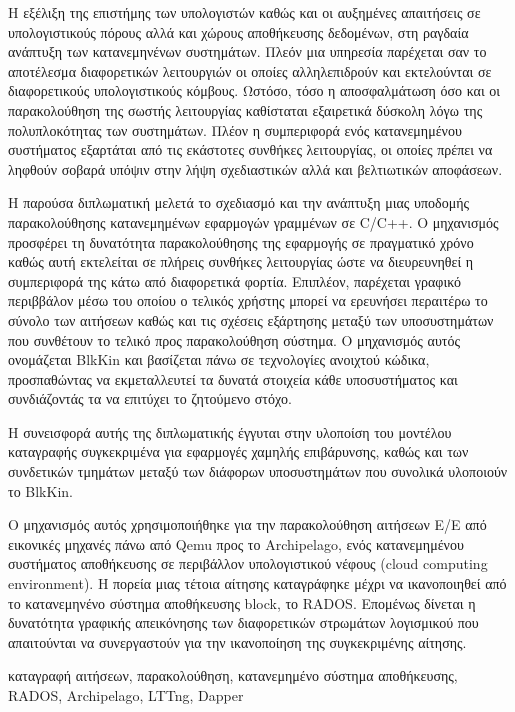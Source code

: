 \begin{abstractgr}
Η εξέλιξη της επιστήμης των υπολογιστών καθώς και οι αυξημένες απαιτήσεις σε
υπολογιστικούς πόρους αλλά και χώρους αποθήκευσης δεδομένων, στη ραγδαία
ανάπτυξη των κατανεμηνένων συστημάτων. Πλεόν μια υπηρεσία παρέχεται σαν το
αποτέλεσμα διαφορετικών λειτουργιών οι οποίες αλληλεπιδρούν και εκτελούνται σε
διαφορετικούς υπολογιστικούς κόμβους. Ωστόσο, τόσο η αποσφαλμάτωση όσο και οι
παρακολούθηση της σωστής λειτουργίας καθίσταται εξαιρετικά δύσκολη λόγω της
πολυπλοκότητας των συστημάτων. Πλέον η συμπεριφορά ενός κατανεμημένου συστήματος
εξαρτάται από τις εκάστοτες συνθήκες λειτουργίας, οι οποίες πρέπει να ληφθούν
σοβαρά υπόψιν στην λήψη σχεδιαστικών αλλά και βελτιωτικών αποφάσεων.

Η παρούσα διπλωματική μελετά το σχεδιασμό και την ανάπτυξη μιας υποδομής
παρακολούθησης κατανεμημένων εφαρμογών γραμμένων σε C/C++. Ο μηχανισμός
προσφέρει τη δυνατότητα παρακολούθησης της εφαρμογής σε πραγματικό χρόνο καθώς
αυτή εκτελείται σε πλήρεις συνθήκες λειτουργίας ώστε να διευρευνηθεί η
συμπεριφορά της κάτω από διαφορετικά φορτία. Επιπλέον, παρέχεται γραφικό
περιββάλον μέσω του οποίου ο τελικός χρήστης μπορεί να ερευνήσει περαιτέρω το
σύνολο των αιτήσεων καθώς και τις σχέσεις εξάρτησης μεταξύ των υποσυστημάτων που
συνθέτουν το τελικό προς παρακολούθηση σύστημα. Ο μηχανισμός αυτός ονομάζεται
BlkKin και βασίζεται πάνω σε τεχνολογίες ανοιχτού κώδικα, προσπαθώντας να
εκμεταλλευτεί τα δυνατά στοιχεία κάθε υποσυστήματος και συνδιάζοντάς τα να
επιτύχει το ζητούμενο στόχο.

Η συνεισφορά αυτής της διπλωματικής έγγυται στην υλοποίση του μοντέλου
καταγραφής συγκεκριμένα για εφαρμογές χαμηλής επιβάρυνσης, καθώς και των
συνδετικών τμημάτων μεταξύ των διάφορων υποσυστημάτων που συνολικά υλοποιούν το
BlkKin.

Ο μηχανισμός αυτός χρησιμοποιήθηκε για την παρακολούθηση αιτήσεων Ε/Ε από
εικονικές μηχανές πάνω από Qemu προς το Archipelago, ενός κατανεμημένου
συστήματος αποθήκευσης σε περιβάλλον υπολογιστικού νέφους (cloud computing
environment). Η πορεία μιας τέτοια αίτησης καταγράφηκε μέχρι να ικανοποιηθεί από
το κατανεμηνένο σύστημα αποθήκευσης block, το RADOS. Επομένως δίνεται η
δυνατότητα γραφικής απεικόνησης των διαφορετικών στρωμάτων λογισμικού που
απαιτούνται να συνεργαστούν για την ικανοποίηση της συγκεκριμένης αίτησης.	
    \begin{keywordsgr}
    καταγραφή αιτήσεων, παρακολούθηση, κατανεμημένο σύστημα αποθήκευσης, RADOS,
    Archipelago, LTTng, Dapper
	\end{keywordsgr}
\end{abstractgr}

